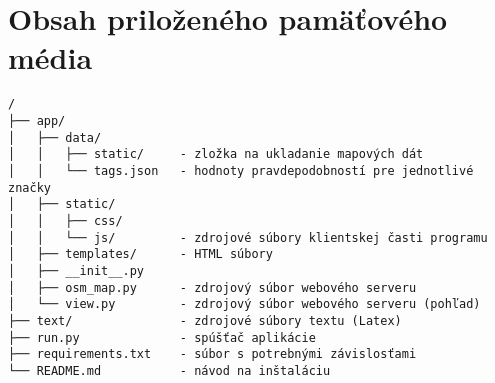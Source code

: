 

\chapter{Obsah priloženého pamäťového média}
\begin{verbatim}
/
├── app/
│   ├── data/
│   │   ├── static/     - zložka na ukladanie mapových dát
│   │   └── tags.json   - hodnoty pravdepodobností pre jednotlivé značky
│   ├── static/     
│   │   ├── css/
│   │   └── js/         - zdrojové súbory klientskej časti programu
│   ├── templates/      - HTML súbory
│   ├── __init__.py
│   ├── osm_map.py      - zdrojový súbor webového serveru
│   └── view.py         - zdrojový súbor webového serveru (pohľad)
├── text/               - zdrojové súbory textu (Latex)
├── run.py              - spúšťač aplikácie
├── requirements.txt    - súbor s potrebnými závislosťami
└── README.md           - návod na inštaláciu
\end{verbatim}
